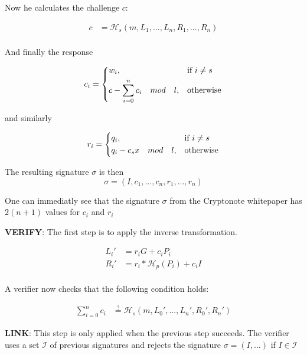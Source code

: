 Now he calculates the challenge $c$:

\begin{equation}
\begin{split}
c &= \mathcal{H}_s(m, L_1, ..., L_n, R_1, ..., R_n)\\
\end{split}
\end{equation}

And finally the response 

\[
c_i= 
\begin{dcases}
w_i,& \text{if } i \not= s\\
c-\sum_{i=0}^n c_i \quad mod\quad l,              & \text{otherwise}
\end{dcases}
\]

and similarly

\[
r_i= 
\begin{dcases}
q_i,& \text{if } i \not= s\\
q_i-c_sx \quad mod\quad l,              & \text{otherwise}
\end{dcases}
\]

The resulting signature $\sigma$ is then
\[
\sigma = (I, c_1, ..., c_n, r_1, ..., r_n)
\]

One can immediatly see that the signature $\sigma$ from the Cryptonote whitepaper has $2(n+1)$ values for $c_i$ and $r_i$

\hfill \break\textbf{VERIFY}: 
The first step is to apply the inverse transformation.

\begin{equation}
\begin{split}
L_i' &= r_iG+c_iP_i\\
R_i' &= r_i*\mathcal{H}_p(P_i)+c_iI\\ 
\end{split}
\end{equation}


A verifier now checks that the following condition holds:

\begin{equation}
\begin{split}
\sum_{i=0}^n c_i &\stackrel{?}{=}	 \mathcal{H}_s(m, L_0', ..., L_n', R_0', R_n')
\end{split}
\end{equation}

\hfill \break\textbf{LINK}: 
This step is only applied when the previous step succeeds. 
The verifier uses a set $\mathcal{I}$ of previous signatures and rejects the signature $\sigma = (I,... )$ if $I \in \mathcal{I}$

